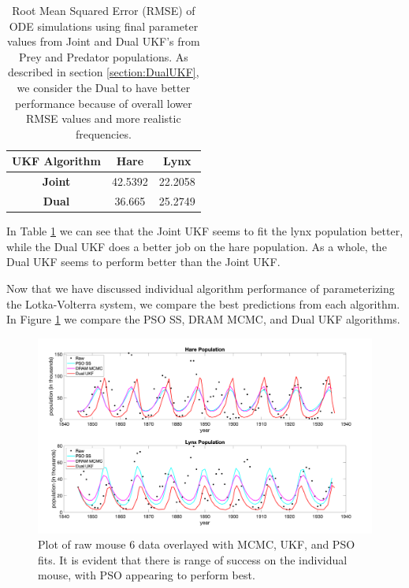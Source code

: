 \begin{table}[H]
  \begin{center}
    \begin{tabular}{c|c c} %
      \hline
      \textbf{UKF Algorithm} & \textbf{Hare} & \textbf{Lynx} \\
      \hline
      \textbf{Joint} & 42.5392 & 22.2058\\
      \textbf{Dual} & 36.665 & 25.2749\\\hline
      \hline
    \end{tabular}
    \caption{Root Mean Squared Error (RMSE) of ODE simulations using final parameter values from Joint and Dual UKF's from Prey and Predator populations. As described in section \ref{section:DualUKF}, we consider the Dual to have better performance because of overall lower RMSE values and more realistic frequencies.}
    \label{table:Results_LV_ODESims_RMSE}
  \end{center}
\end{table}
In Table \ref{table:Results_LV_ODESims_RMSE} we can see that the Joint UKF seems to fit the lynx population better, while the Dual UKF does a better job on the hare population. As a whole, the Dual UKF seems to perform better than the Joint UKF.
\par Now that we have discussed individual algorithm performance of parameterizing the Lotka-Volterra system, we compare the best predictions from each algorithm. In Figure \ref{fig:LVall} we compare the PSO SS, DRAM MCMC, and Dual UKF algorithms.
\begin{figure}[H]
    \centering
    \includegraphics[width=15cm]{Final_Paper_Pieces/LV_Comparison_Figs/LVall_v2.png}
    \caption{Plot of raw mouse 6 data overlayed with MCMC, UKF, and PSO fits. It is evident that there is range of success on the individual mouse, with PSO appearing to perform best.}
    \label{fig:LVall}
\end{figure}
